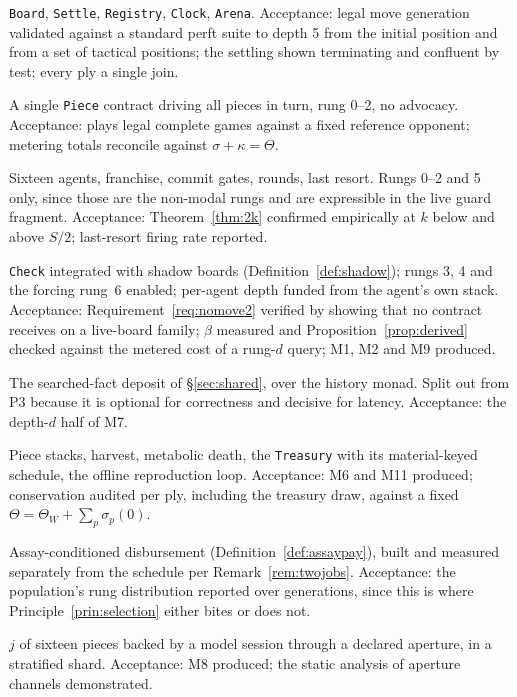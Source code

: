 \documentclass[11pt,a4paper]{article}
\theoremstyle{plain}
\theoremstyle{definition}
\theoremstyle{remark}
\begin{document}
\begin{description}[leftmargin=1.6em,style=nextline]
\item[P0 --- the world alone.] \texttt{Board}, \texttt{Settle},
\texttt{Registry}, \texttt{Clock}, \texttt{Arena}. Acceptance: legal move
generation validated against a standard perft suite to depth 5 from the initial
position and from a set of tactical positions; the settling shown terminating
and confluent by test; every ply a single join.
\item[P1 --- one agent, no society.] A single \texttt{Piece} contract driving
all pieces in turn, rung 0--2, no advocacy. Acceptance: plays legal complete
games against a fixed reference opponent; metering totals reconcile against
$\sigma + \kappa = \Theta$.
\item[P2 --- the society, arithmetic guards.] Sixteen agents, franchise, commit
gates, rounds, last resort. Rungs 0--2 and 5 only, since those are the non-modal
rungs and are expressible in the live guard fragment. Acceptance:
Theorem~\ref{thm:2k} confirmed empirically at $k$ below and above $S/2$;
last-resort firing rate reported.
\item[P3 --- the checker, and lookahead.] \texttt{Check} integrated with shadow
boards (Definition~\ref{def:shadow}); rungs 3, 4 and the forcing rung~6
enabled; per-agent depth funded from the agent's own stack. Acceptance:
Requirement~\ref{req:nomove2} verified by showing that no contract receives on
a live-board family; $\beta$ measured and
Proposition~\ref{prop:derived} checked against the metered cost of a rung-$d$
query; M1, M2 and M9 produced.
\item[P3a --- shared search memory.] The searched-fact deposit of
\S\ref{sec:shared}, over the history monad. Split out from P3 because it is
optional for correctness and decisive for latency. Acceptance: the depth-$d$ half
of M7.
\item[P4 --- the economy.] Piece stacks, harvest, metabolic death, the
\texttt{Treasury} with its material-keyed schedule, the offline reproduction
loop. Acceptance: M6 and M11 produced; conservation audited per ply, including
the treasury draw, against a fixed $\Theta = \Theta_W + \sum_p \sigma_p(0)$.
\item[P4a --- selection.] Assay-conditioned disbursement
(Definition~\ref{def:assaypay}), built and measured separately from the
schedule per Remark~\ref{rem:twojobs}. Acceptance: the population's rung
distribution reported over generations, since this is where
Principle~\ref{prin:selection} either bites or does not.
\item[P5 --- the aperture variant.] $j$ of sixteen pieces backed by a model
session through a declared aperture, in a stratified shard. Acceptance: M8
produced; the static analysis of aperture channels demonstrated.
\end{description}
\end{document}
